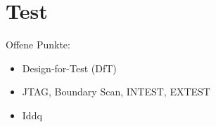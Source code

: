 \part{Test}


Offene Punkte:

\begin{itemize}
    \item{Design-for-Test (DfT)}
    \item{JTAG, Boundary Scan, INTEST, EXTEST}
    \item{Iddq}
\end{itemize}

